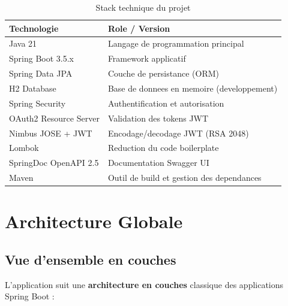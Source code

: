 \documentclass[12pt,a4paper]{report}
\begin{document}
\begin{table}[h!]
\centering
\begin{tabularx}{\linewidth}{l X}
\toprule
\textbf{Technologie}         & \textbf{Role / Version} \\
\midrule
Java 21                      & Langage de programmation principal \\
Spring Boot 3.5.x            & Framework applicatif \\
Spring Data JPA              & Couche de persistance (ORM) \\
H2 Database                  & Base de donnees en memoire (developpement) \\
Spring Security              & Authentification et autorisation \\
OAuth2 Resource Server       & Validation des tokens JWT \\
Nimbus JOSE + JWT            & Encodage/decodage JWT (RSA 2048) \\
Lombok                       & Reduction du code boilerplate \\
SpringDoc OpenAPI 2.5        & Documentation Swagger UI \\
Maven                        & Outil de build et gestion des dependances \\
\bottomrule
\end{tabularx}
\caption{Stack technique du projet}
\end{table}

\chapter{Architecture Globale}

\section{Vue d'ensemble en couches}

L'application suit une \textbf{architecture en couches} classique des
applications Spring Boot :

\begin{center}
\end{center}
\end{document}
